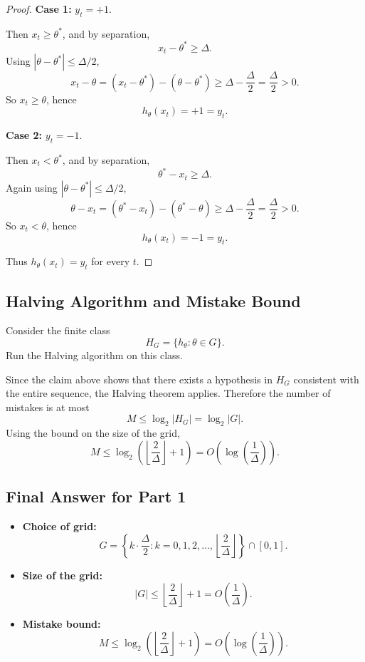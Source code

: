 \documentclass{article}
\begin{document}
\begin{solutionbox}
\begin{proof}
\textbf{Case 1:} $y_t=+1$.

Then $x_t \ge \theta^*$, and by separation,
\[
x_t-\theta^* \ge \Delta.
\]
Using $|\theta-\theta^*| \le \Delta/2$,
\[
x_t-\theta
=
(x_t-\theta^*)-(\theta-\theta^*)
\ge
\Delta-\frac{\Delta}{2}
=
\frac{\Delta}{2}
>0.
\]
So $x_t \ge \theta$, hence
\[
h_\theta(x_t)=+1=y_t.
\]

\textbf{Case 2:} $y_t=-1$.

Then $x_t<\theta^*$, and by separation,
\[
\theta^*-x_t \ge \Delta.
\]
Again using $|\theta-\theta^*| \le \Delta/2$,
\[
\theta-x_t
=
(\theta^*-x_t)-(\theta^*-\theta)
\ge
\Delta-\frac{\Delta}{2}
=
\frac{\Delta}{2}
>0.
\]
So $x_t<\theta$, hence
\[
h_\theta(x_t)=-1=y_t.
\]

Thus $h_\theta(x_t)=y_t$ for every $t$.
\end{proof}

\subsection{Halving Algorithm and Mistake Bound}

Consider the finite class
\[
H_G=\{h_\theta:\theta\in G\}.
\]
Run the Halving algorithm on this class.

Since the claim above shows that there exists a hypothesis in $H_G$ consistent
with the entire sequence, the Halving theorem applies. Therefore the number of
mistakes is at most
\[
M \le \log_2 |H_G| = \log_2 |G|.
\]
Using the bound on the size of the grid,
\[
M
\le
\log_2\!\left(\left\lfloor \frac{2}{\Delta}\right\rfloor+1\right)
=
O\!\left(\log\left(\frac{1}{\Delta}\right)\right).
\]

\subsection*{Final Answer for Part 1}

\begin{itemize}[leftmargin=2.5em]
    \item \textbf{Choice of grid:}
    \[
    G=
    \left\{
    k\cdot \frac{\Delta}{2}
    :
    k=0,1,2,\dots,\left\lfloor \frac{2}{\Delta}\right\rfloor
    \right\}
    \cap [0,1].
    \]

    \item \textbf{Size of the grid:}
    \[
    |G|
    \le
    \left\lfloor \frac{2}{\Delta}\right\rfloor+1
    =
    O\!\left(\frac{1}{\Delta}\right).
    \]

    \item \textbf{Mistake bound:}
    \[
    M
    \le
    \log_2\!\left(\left\lfloor \frac{2}{\Delta}\right\rfloor+1\right)
    =
    O\!\left(\log\left(\frac{1}{\Delta}\right)\right).
    \]
\end{itemize}

\end{solutionbox}
\end{document}

